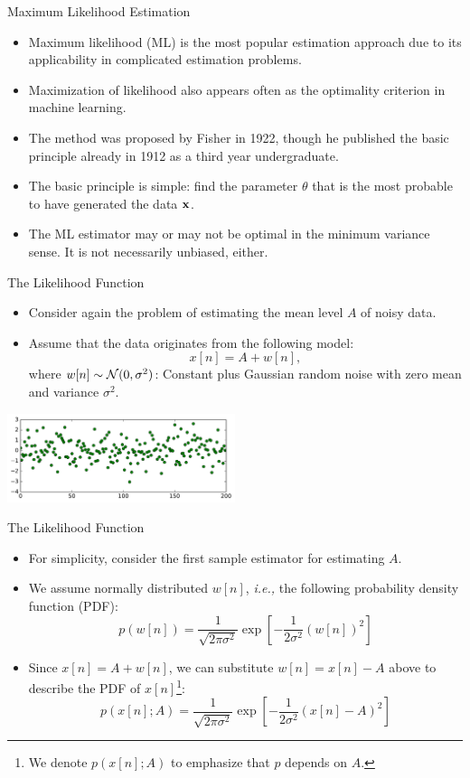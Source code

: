 \documentclass[10pt, aspectratio=169]{beamer} %
\newcommand{\x}{{\bf x}}
\begin{document}
\begin{frame}[allowframebreaks=0.8]
{Maximum Likelihood Estimation}
\begin{itemize}
\item Maximum likelihood (ML) is the most popular estimation approach
  due to its applicability in complicated estimation problems.
	\item Maximization of likelihood also appears often as the optimality criterion in machine learning.
\item The method was proposed by Fisher in 1922, though he published
  the basic principle already in 1912 as a third year undergraduate.
\item The basic principle is simple: find the parameter $\theta$ that
  is the most probable to have generated the data $\x$.
\item The ML estimator may or may not be optimal in the minimum
  variance sense. It is not necessarily unbiased, either.
\end{itemize}
\end{frame}

\begin{frame}[allowframebreaks=0.8]{The Likelihood Function}
\begin{itemize}
\item Consider again the problem of estimating the mean level $A$ of noisy data.
\item Assume that the data originates from the following model:
\[
x[n] = A + w[n],
\]
where $w[n] \sim {\cal N}(0,\sigma^2)$: Constant plus Gaussian random noise with zero mean and variance $\sigma^2$.
\end{itemize}
\centerline{\includegraphics[width = 0.5\textwidth]{GaussianRV.pdf}}
\end{frame}

\begin{frame}[allowframebreaks=0.8]{The Likelihood Function}
\begin{itemize}
\item For simplicity, consider the first sample estimator for estimating $A$.
\item We assume normally distributed $w[n]$, \emph{i.e.,} the following  probability density function (PDF):
\[
p(w[n]) = \frac{1}{\sqrt{2\pi\sigma^2}}\exp\left[{-\frac{1}{2\sigma^2}(w[n])^2}\right]
\]
\item Since $x[n] = A + w[n]$, we can substitute $w[n] = x[n] - A$ above to describe the PDF of
$x[n]$\footnote{We denote $p(x[n];A)$ to emphasize that $p$ depends on $A$.}:
\[
p(x[n]; A) = \frac{1}{\sqrt{2\pi\sigma^2}}\exp\left[{-\frac{1}{2\sigma^2}(x[n]-A)^2}\right]
\]
\end{itemize}
\end{frame}
\end{document}
